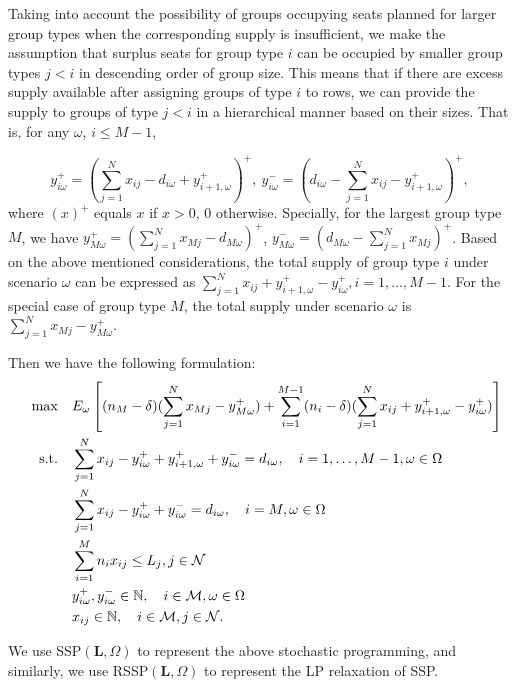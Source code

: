 Taking into account the possibility of groups occupying seats planned for larger group types when the corresponding supply is insufficient, we make the assumption that surplus seats for group type $i$ can be occupied by smaller group types $j<i$ in descending order of group size. This means that if there are excess supply available after assigning groups of type $i$ to rows, we can provide the supply to groups of type $j<i$ in a hierarchical manner based on their sizes. That is, for any $\omega$, $i \leq M-1$, 

$$y_{i \omega}^{+}=\left(\sum_{j=1}^N x_{ij}- d_{i \omega} + y_{i+1, \omega}^{+}\right)^{+}, ~y_{i \omega}^{-}=\left(d_{i \omega}- \sum_{j=1}^N x_{ij} - y_{i+1, \omega}^{+} \right)^{+},$$
where $(x)^{+}$ equals $x$ if $x>0$, $0$ otherwise. Specially, for the largest group type $M$, we have $y_{M \omega}^{+} = (\sum_{j=1}^N x_{Mj} - d_{M \omega})^{+}$, $y_{M \omega}^{-} = (d_{M \omega}- \sum_{j=1}^N x_{Mj})^{+}$. Based on the above mentioned considerations, the total supply of group type $i$ under scenario $\omega$ can be expressed as $\sum_{j= 1}^{N} x_{ij} + y_{i+1,\omega}^{+} - y_{i \omega}^{+}, i = 1, \ldots, M-1$. For the special case of group type $M$, the total supply under scenario $\omega$ is $\sum_{j= 1}^{N} x_{Mj} - y_{M \omega}^{+}$.


Then we have the following formulation:
  \begin{align}
  \quad \max \quad & E_{\omega}\left[(n_{M}-\delta) (\sum_{j= 1}^{N} x_{Mj} - y_{M \omega}^{+}) + \sum_{i=1}^{M-1} (n_i-\delta) (\sum_{j= 1}^{N} x_{ij} + y_{i+1,\omega}^{+} - y_{i \omega}^{+})\right] \\
  \text {s.t.} \quad & \sum_{j= 1}^{N} x_{ij}-y_{i \omega}^{+}+
  y_{i+1, \omega}^{+} + y_{i \omega}^{-}=d_{i \omega}, \quad i = 1,\ldots, M-1, \omega \in \Omega \label{DEF_constr1} \\
  & \sum_{j= 1}^{N} x_{ij} -y_{i \omega}^{+}+y_{i \omega}^{-}=d_{i \omega}, \quad i = M, \omega \in \Omega \label{DEF_constr2}\\
  & \sum_{i=1}^{M} n_{i} x_{ij} \leq L_j, j \in \mathcal{N}  \label{DEF_constr3} \\
  & y_{i \omega}^{+}, y_{i \omega}^{-} \in \mathbb{N}, \quad i \in \mathcal{M}, \omega \in \Omega \notag \\
  & x_{ij} \in \mathbb{N}, \quad i \in \mathcal{M}, j \in \mathcal{N} \notag.
  \end{align}

We use SSP$(\mathbf{L}, \Omega)$ to represent the above stochastic programming, and similarly, we use RSSP$(\mathbf{L}, \Omega)$ to represent the LP relaxation of SSP. 


